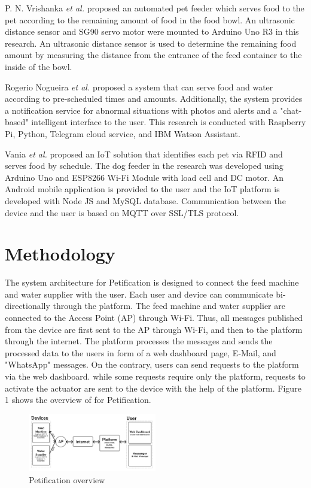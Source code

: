 ﻿\documentclass[conference]{IEEEtran}
\begin{document}
P. N. Vrishanka \textit{et al.} \cite{b9} proposed an automated pet feeder which serves food to the pet according to the remaining amount of food in the food bowl.
An ultrasonic distance sensor and SG90 servo motor were mounted to Arduino Uno R3 in this research.
An ultrasonic distance sensor is used to determine the remaining food amount by measuring the distance from the entrance of the feed container to the inside of the bowl.

Rogerio Nogueira \textit{et al.} \cite{b10} proposed a system that can serve food and water according to pre-scheduled times and amounts.
Additionally, the system provides a notification service for abnormal situations with photos and alerts and a "chat-based" intelligent interface to the user.
This research is conducted with Raspberry Pi, Python, Telegram cloud service, and IBM Watson Assistant.

Vania \textit{et al.} \cite{b11} proposed an IoT solution that identifies each pet via RFID and serves food by schedule.
The dog feeder in the research was developed using Arduino Uno and ESP8266 Wi-Fi Module with load cell and DC motor.
An Android mobile application is provided to the user and the IoT platform is developed with Node JS and MySQL database.
Communication between the device and the user is based on MQTT over SSL/TLS protocol.

\section{Methodology}
The system architecture for Petification is designed to connect the feed machine and water supplier with the user.
Each user and device can communicate bi-directionally through the platform.
The feed machine and water supplier are connected to the Access Point (AP) through Wi-Fi.
Thus, all messages published from the device are first sent to the AP through Wi-Fi, and then to the platform through the internet.
The platform processes the messages and sends the processed data to the users in form of a web dashboard page, E-Mail, and "WhatsApp" messages.
On the contrary, users can send requests to the platform via the web dashboard.
while some requests require only the platform, requests to activate the actuator are sent to the device with the help of the platform.
Figure 1 shows the overview of for Petification.


\begin{figure}[htbp]
\centerline{\includegraphics[width=0.5\textwidth]{./images/Overview.png}}
\caption{Petification overview}
\label{fig}
\end{figure}
\end{document}
